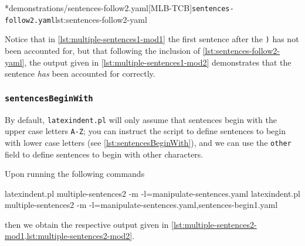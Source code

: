 	\begin{minipage}{.55\linewidth}
	\end{minipage}
	\hfill
	\begin{minipage}{.45\linewidth}
		\cmhlistingsfromfile*[style=yaml-LST]*{demonstrations/sentences-follow2.yaml}[MLB-TCB]{\texttt{sentences-follow2.yaml}}{lst:sentences-follow2-yaml}
	\end{minipage}

	Notice that in \cref{lst:multiple-sentences1-mod1} the first sentence after the \texttt{)} has not been accounted for, but that following the inclusion of \cref{lst:sentences-follow2-yaml}, the output given in \cref{lst:multiple-sentences1-mod2} demonstrates that the sentence \emph{has} been accounted for correctly.

\subsubsection{\texttt{sentencesBeginWith}}
	By default, \texttt{latexindent.pl} will only assume that sentences begin with the upper case letters \texttt{A-Z}; you can instruct the script to define sentences to begin with lower case letters (see \cref{lst:sentencesBeginWith}), and we can use the \texttt{other} field to define sentences to begin with other characters.


	Upon running the following commands \begin{widepage} \begin{commandshell}
latexindent.pl multiple-sentences2 -m -l=manipulate-sentences.yaml
latexindent.pl multiple-sentences2 -m -l=manipulate-sentences.yaml,sentences-begin1.yaml
	\end{commandshell} \end{widepage} then we obtain the respective output given in \cref{lst:multiple-sentences2-mod1,lst:multiple-sentences2-mod2}.

